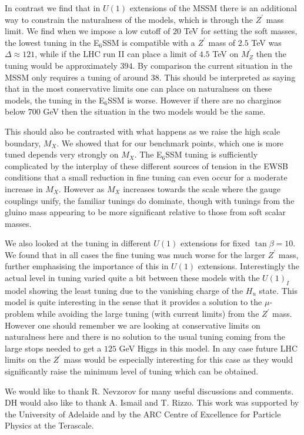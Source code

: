\documentclass[preprint,amsmath,amssymb,aps,superscriptaddress,prd,showpacs,floatfix,nofootinbib]{revtex4-1}
\begin{document}
In contrast we find that in $U(1)$ extensions of the MSSM there is an
additional way to constrain the naturalness of the models, which is
through the $Z^\prime$ mass limit.  We find when we impose a low
cutoff of $20$ TeV for setting the soft masses, the lowest tuning in
the E$_6$SSM is compatible with a $Z^\prime$ mass of $2.5$ TeV was
$\Delta \approx 121$, while if the LHC run II can place a limit of
$4.5$ TeV on $M_Z^\prime$ then the tuning would be approximately $394$.
By comparison the current situation in the MSSM only requires a tuning
of around $38$. This should be interpreted as saying that in
the most conservative limits one can place on naturalness on these
models, the tuning in the E$_6$SSM is worse.  However if there are no
charginos below $700$ GeV then the situation in the two models would
be the same.

This should also be contrasted with what happens as we raise the high
scale boundary, $M_X$.  We showed that for our benchmark points, which
one is more tuned depends very strongly on $M_X$.  The E$_6$SSM tuning
is sufficiently complicated by the interplay of these different
sources of tension in the EWSB conditions that a small reduction in
fine tuning can even occur for a moderate increase in $M_X$.  However
as $M_X$ increases towards the scale where the gauge couplings unify,
the familiar tunings do dominate, though with tunings from the gluino
mass appearing to be more significant relative to those from soft
scalar masses.  


We also looked at the tuning in different $U(1)$ extensions for
fixed $\tan \beta = 10$.  We found that in all cases the fine tuning
was much worse for the larger $Z^\prime$ mass, further emphasising
the importance of this in $U(1)$ extensions.  Interestingly
the actual level in tuning varied quite a bit between these models
with the $U(1)_I$ model showing the least tuning due to the vanishing
charge of the $H_u$ state. This model is quite interesting in the
sense that it provides a solution to the $\mu$-problem while avoiding
the large tuning (with current limits) from the $Z^\prime$
mass. However one should remember we are looking at conservative limits
on naturalness here and there is no solution to the usual tuning coming from
the large stops needed to get a $125$ GeV Higgs in this model.  In any
case future LHC limits on the $Z^\prime$ mass would be especially
interesting for this case as they would significantly raise the
minimum level of tuning which can be obtained.

\acknowledgements
We would like to thank R. Nevzorov for many useful discussions and comments. DH would also like to thank A. Ismail and T. Rizzo. This work was supported by the University of Adelaide and by the ARC Centre of Excellence for Particle Physics at the Terascale.
\end{document}
